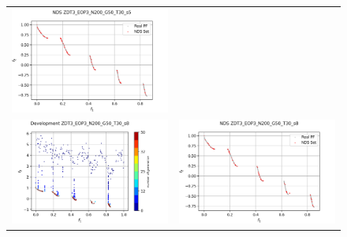 \begin{figure}[H]
\begin{tabular}{c c}
    \includegraphics[scale=0.5]{figures/ZDT3_EOP3_N200_G50_T30/s5_nds.png}\\
    \includegraphics[scale=0.5]{figures/ZDT3_EOP3_N200_G50_T30/s8_dev.png} &
    \includegraphics[scale=0.5]{figures/ZDT3_EOP3_N200_G50_T30/s8_nds.png}\\

\end{tabular}
\end{figure}

